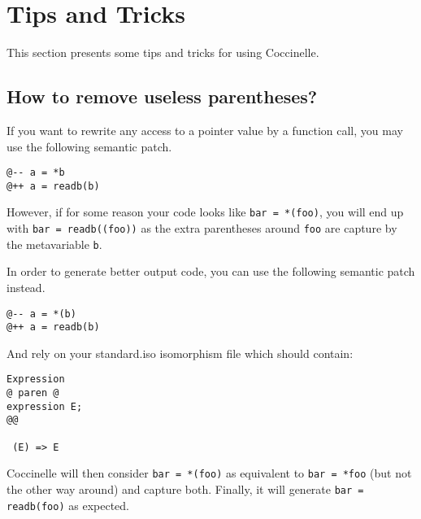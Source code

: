 
\section{Tips and Tricks}

This section presents some tips and tricks for using Coccinelle.

\subsection{How to remove useless parentheses?}

If you want to rewrite any access to a pointer value by a function
call, you may use the following semantic patch.

\begin{lstlisting}[language=Cocci]
@-- a = *b
@++ a = readb(b)
\end{lstlisting}

However, if for some reason your code looks like \verb|bar = *(foo)|,
you will end up with \verb|bar = readb((foo))| as the extra
parentheses around \texttt{foo} are capture by the metavariable
\texttt{b}.

In order to generate better output code, you can use the following
semantic patch instead.
\begin{lstlisting}[language=Cocci]
@-- a = *(b)
@++ a = readb(b)
\end{lstlisting}

\noindent
And rely on your standard.iso isomorphism file which should contain:
\begin{lstlisting}[language=Cocci]
Expression
@ paren @
expression E;
@@

 (E) => E
\end{lstlisting}

Coccinelle will then consider \verb|bar = *(foo)| as equivalent to
\verb|bar = *foo| (but not the other way around) and capture both.
Finally, it will generate \verb|bar = readb(foo)| as expected.


